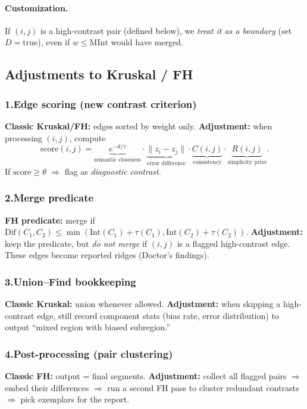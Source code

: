 \documentclass[11pt]{article}
\begin{document}
\paragraph{Customization.} If $(i,j)$ is a high-contrast pair (defined below), we \emph{treat it as a boundary} (set $D=\text{true}$), even if $w \le \mathrm{MInt}$ would have merged.

\subsection{Adjustments to Kruskal / FH}\label{sec:adjust}
\subsubsection*{1.\;Edge scoring (new contrast criterion)}
\textbf{Classic Kruskal/FH:} edges sorted by weight only. \textbf{Adjustment:} when processing $(i,j)$, compute
\[\mathrm{score}(i,j) = \underbrace{e^{-d/\tau}}_{\text{semantic closeness}}\cdot \underbrace{\|z_i-z_j\|}_{\text{error difference}}\cdot \underbrace{C(i,j)}_{\text{consistency}}\cdot \underbrace{R(i,j)}_{\text{simplicity prior}}.\]
If $\mathrm{score}\ge \theta$ $\Rightarrow$ flag as \emph{diagnostic contrast}.

\subsubsection*{2.\;Merge predicate}
\textbf{FH predicate:} merge if $\mathrm{Dif}(C_1,C_2)\le \min(\mathrm{Int}(C_1)+\tau(C_1), \mathrm{Int}(C_2)+\tau(C_2))$. \textbf{Adjustment:} keep the predicate, but \emph{do not merge} if $(i,j)$ is a flagged high-contrast edge. These edges become reported ridges (Doctor's findings).

\subsubsection*{3.\;Union--Find bookkeeping}
\textbf{Classic Kruskal:} union whenever allowed. \textbf{Adjustment:} when skipping a high-contrast edge, still record component stats (bias rate, error distribution) to output ``mixed region with biased subregion.''

\subsubsection*{4.\;Post-processing (pair clustering)}
\textbf{Classic FH:} output = final segments. \textbf{Adjustment:} collect all flagged pairs $\Rightarrow$ embed their differences $\Rightarrow$ run a second FH pass to cluster redundant contrasts $\Rightarrow$ pick exemplars for the report.
\end{document}
